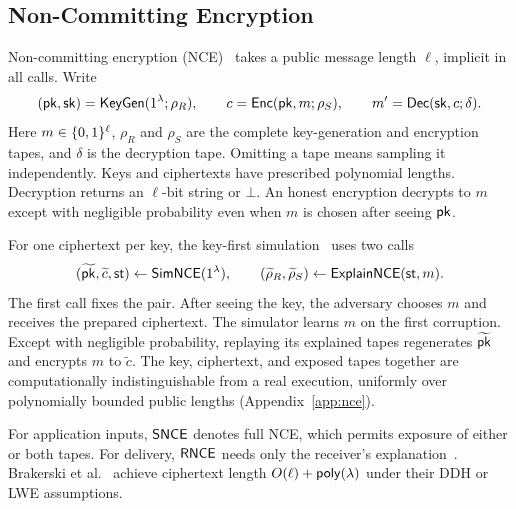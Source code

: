 \subsection{Non-Committing Encryption}
\label{sec:nce}

Non-committing encryption (NCE)~\cite{CanettiEtAl1996AdaptiveMPC}
takes a public message length $\ell$, implicit in all calls. Write
\[
 (\mathsf{pk},\mathsf{sk})=\mathsf{KeyGen}(1^\lambda;\rho_R),\qquad
 c=\mathsf{Enc}(\mathsf{pk},m;\rho_S),\qquad m'=\mathsf{Dec}(\mathsf{sk},c;\delta).
\]
Here $m\in\{0,1\}^\ell$, $\rho_R$ and $\rho_S$ are the complete
key-generation and encryption tapes, and $\delta$ is the decryption
tape. Omitting a tape means sampling it independently. Keys and
ciphertexts have prescribed polynomial lengths. Decryption returns an $\ell$-bit string or $\bot$. An honest
encryption decrypts to $m$ except with negligible probability even when
$m$ is chosen after seeing $\mathsf{pk}$.

For one ciphertext per key, the key-first simulation~\cite{HemenwayEtAl2016QuasiOptimalNCE}
uses two calls
\[
 (\widetilde{\mathsf{pk}},\widetilde c,\mathsf{st})\mathrel{\leftarrow}\mathsf{SimNCE}(1^\lambda),
 \qquad
 (\widetilde\rho_R,\widetilde\rho_S)\mathrel{\leftarrow}\mathsf{ExplainNCE}(\mathsf{st},m).
\]
The first call fixes the pair. After seeing the key, the adversary
chooses $m$ and receives the prepared ciphertext. The simulator learns
$m$ on the first corruption. Except with negligible probability, replaying
its explained tapes regenerates $\widetilde{\mathsf{pk}}$ and encrypts $m$ to
$\widetilde c$. The key, ciphertext, and exposed tapes
together are computationally indistinguishable from a real execution, uniformly over
polynomially bounded public lengths (Appendix~\ref{app:nce}).

For application inputs, $\mathsf{SNCE}$ denotes full NCE, which permits exposure
of either or both tapes. For delivery, $\mathsf{RNCE}$ needs only the receiver's
explanation~\cite{JareckiLysyanskaya2000AdaptiveThreshold}.
Brakerski et al.\
\cite[full version, Theorems~23--24]{BrakerskiEtAl2020ConstantNCE}
achieve ciphertext length $O(\ell)+\mathop{\mathsf{poly}}(\lambda)$ under their DDH or
LWE assumptions.
